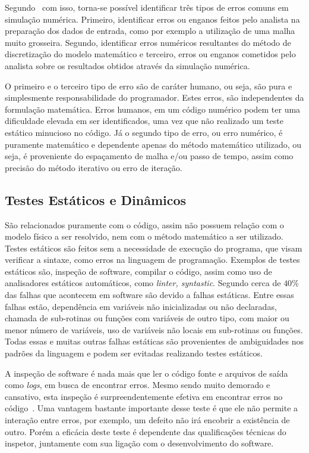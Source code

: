 \documentclass[
	12pt,				  %
	openright,		%
	twoside,			%
	a4paper,			%
	chapter=TITLE,		    %
	english,			%
	brazil				%
	]{abntex2}
\begin{document}
Segundo~ com isso, torna-se possível identificar três
tipos de erros comuns em simulação numérica. Primeiro, identificar erros ou
enganos feitos pelo analista na preparação dos dados de entrada, como por
exemplo a utilização de uma malha muito grosseira. Segundo, identificar erros
numéricos resultantes do método de discretização do modelo matemático e
terceiro, erros ou enganos cometidos pelo analista sobre os resultados obtidos
através da simulação numérica. 

O primeiro e o terceiro tipo de erro são de caráter humano, ou seja, são pura e
simplesmente responsabilidade do programador. Estes erros, são independentes da
formulação matemática. Erros humanos, em um código numérico podem ter uma
dificuldade elevada em ser identificados, uma vez que não realizado um teste
estático minucioso no código. Já o segundo tipo de erro, ou erro numérico, é
puramente matemático e dependente apenas do método matemático utilizado, ou
seja, é proveniente do espaçamento de malha e/ou passo de tempo, assim como
precisão do método iterativo ou erro de iteração.

\subsection{Testes Estáticos e Dinâmicos}\label{sec:teststatic}

São relacionados puramente com o código, assim não possuem relação com o modelo
físico a ser resolvido, nem com o método matemático a ser utilizado. Testes
estáticos são feitos sem a necessidade de execução do programa, que visam
verificar a sintaxe, como erros na linguagem de programação. Exemplos de testes
estáticos são, inspeção de software, compilar o código, assim como uso de
analisadores estáticos automáticos, como \textit{linter, syntastic}. Segundo
 cerca de $40\%$ das falhas que acontecem em software
são devido a falhas estáticas. Entre essas falhas estão, dependência em
variáveis não inicializadas ou não declaradas, chamada de sub-rotinas ou funções
com variáveis de outro tipo, com maior ou menor número de variáveis, uso de
variáveis não locais em sub-rotinas ou funções. Todas essas e muitas outras
falhas estáticas são provenientes de ambiguidades nos padrões da linguagem e
podem ser evitadas realizando testes estáticos. 

A inspeção de software é nada mais que ler o código fonte e arquivos de saída
como \textit{logs}, em busca de encontrar erros. Mesmo sendo muito demorado e
cansativo, esta inspeção é surpreendentemente efetiva em encontrar erros no
código~\cite{sommerville2004}. Uma vantagem bastante importante desse teste é
que ele não permite a interação entre erros, por exemplo, um defeito não irá
encobrir a existência de outro. Porém a eficácia deste teste é dependente das
qualificações técnicas do inspetor, juntamente com sua ligação com o
desenvolvimento do software. 
\end{document}
